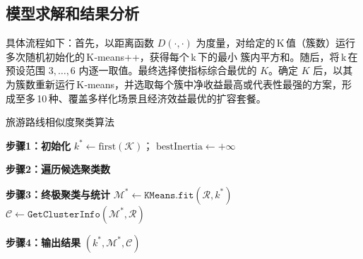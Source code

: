 

\subsection[\hspace{-2pt}模型求解和结果分析]{{\heiti{} \hspace{-8pt}模型求解和结果分析}}\label{section2: 模型求解和结果分析}

具体流程如下：首先，以距离函数 $D(\cdot,\cdot)$ 为度量，对给定的 K 值（簇数）运行多次随机初始化的 K‑means++，获得每个 k 下的最小 簇内平方和。随后，将 k 在预设范围 $3,\dots ,6$ 内逐一取值。最终选择使指标综合最优的 $K$。确定 $K$ 后，以其为簇数重新运行 K‑means，并选取每个簇中净收益最高或代表性最强的方案，形成至多 10 种、覆盖多样化场景且经济效益最优的扩容套餐。

\begin{algorithm}[H]\small
  \renewcommand{\algorithmcfname}{算法}
  \caption{旅游路线相似度聚类算法}\label{alg:kmeans_route}


  \textbf{步骤1：初始化}\;
  $k^* \leftarrow \text{first}(\mathcal K)$；\;
  $\text{bestInertia}\leftarrow+\infty$\;

  \textbf{步骤2：遍历候选聚类数}\;

  \textbf{步骤3：终极聚类与统计}\;
  $\mathcal M^* \leftarrow \texttt{KMeans.fit}(\mathcal R,k^*)$\;
  $\mathcal C \leftarrow \texttt{GetClusterInfo}(\mathcal M^*,\mathcal R)$\;

  \textbf{步骤4：输出结果}\;
  \Return $(k^*,\mathcal M^*,\mathcal C)$\;
\end{algorithm}

